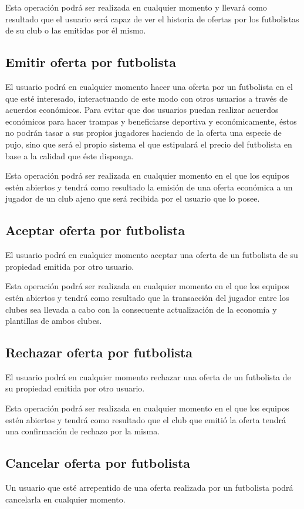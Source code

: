 Esta operación podrá ser realizada en cualquier momento y llevará como resultado
que el usuario será capaz de ver el historia de ofertas por los futbolistas de
su club o las emitidas por él mismo.
\subsection*{Emitir oferta por futbolista}
El usuario podrá en cualquier momento hacer una oferta por un futbolista en el
que esté interesado, interactuando de este modo con otros usuarios a través de
acuerdos económicos. Para evitar que dos usuarios puedan realizar acuerdos
económicos para hacer trampas y beneficiarse deportiva y económicamente, éstos
no podrán tasar a sus propios jugadores haciendo de la oferta una especie de
pujo, sino que será el propio sistema el que estipulará el precio del futbolista
en base a la calidad que éste disponga.

Esta operación podrá ser realizada en cualquier momento en el que los equipos
estén abiertos y tendrá como resultado la emisión de una oferta económica a un
jugador de un club ajeno que será recibida por el usuario que lo posee.

\subsection*{Aceptar oferta por futbolista}
El usuario podrá en cualquier momento aceptar una oferta de un futbolista de su
propiedad emitida por otro usuario.

Esta operación podrá ser realizada en cualquier momento en el que los equipos
estén abiertos y tendrá como resultado que la transacción del jugador entre los
clubes sea llevada a cabo con la consecuente actualización de la economía y
plantillas de ambos clubes.

\subsection*{Rechazar oferta por futbolista}
El usuario podrá en cualquier momento rechazar una oferta de un futbolista de su
propiedad emitida por otro usuario.

Esta operación podrá ser realizada en cualquier momento en el que los equipos
estén abiertos y tendrá como resultado que el club que emitió la oferta tendrá
una confirmación de rechazo por la misma.

\subsection*{Cancelar oferta por futbolista}
Un usuario que esté arrepentido de una oferta realizada por un futbolista podrá
cancelarla en cualquier momento.

